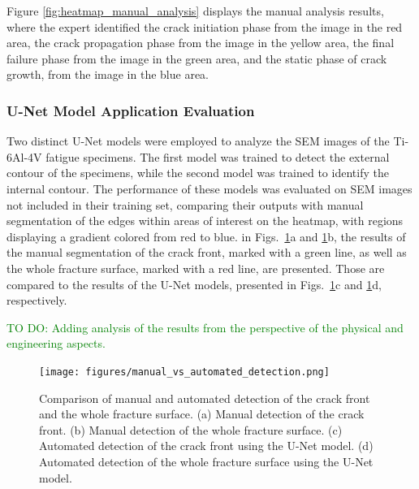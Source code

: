 \documentclass[preprint,12pt]{elsarticle}
\begin{document}
Figure \ref{fig:heatmap_manual_analysis} displays the manual analysis results,
where the expert identified the crack initiation phase from the image in the red area,
the crack propagation phase from the image in the yellow area,
the final failure phase from the image in the green area, and the static phase of crack growth,
from the image in the blue area.



\subsubsection{U-Net Model Application Evaluation}
\label{Subsubsec: U-Net Model Application Evaluation}
Two distinct U-Net models were employed to analyze the SEM images of the Ti-6Al-4V fatigue specimens.
The first model was trained to detect the external contour of the specimens, while the second model was trained to identify the internal contour.
The performance of these models was evaluated on SEM images not included in their training set, comparing their outputs with manual segmentation of the edges within areas of interest on the heatmap, with regions displaying a gradient colored from red to blue.
in Figs.~\ref{fig:manual_vs_automated_detection}a and \ref{fig:manual_vs_automated_detection}b, the results of the manual segmentation of the crack front, marked with a green line, as well as the whole fracture surface, marked with a red line, are presented.
Those are compared to the results of the U-Net models, presented in Figs.~\ref{fig:manual_vs_automated_detection}c and \ref{fig:manual_vs_automated_detection}d, respectively.


\textcolor{green}{TO DO: Adding analysis of the results from the perspective of the physical and engineering aspects.}

\begin{figure}[ht!]
\centering
\texttt{[image: figures/manual\_vs\_automated\_detection.png]}
\caption{Comparison of manual and automated detection of the crack front and the whole fracture surface. (a) Manual detection of the crack front. (b) Manual detection of the whole fracture surface. (c) Automated detection of the crack front using the U-Net model. (d) Automated detection of the whole fracture surface using the U-Net model.}
\label{fig:manual_vs_automated_detection}
\end{figure}
\end{document}

